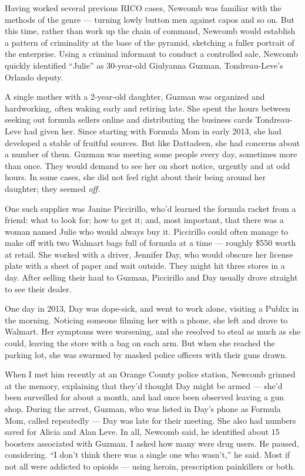 Having worked several previous RICO cases, Newcomb was familiar with the
methods of the genre --- turning lowly button men against capos and so
on. But this time, rather than work up the chain of command, Newcomb
would establish a pattern of criminality at the base of the pyramid,
sketching a fuller portrait of the enterprise. Using a criminal
informant to conduct a controlled sale, Newcomb quickly identified
``Julie'' as 30-year-old Giulyanna Guzman, Tondreau-Leve's Orlando
deputy.

A single mother with a 2-year-old daughter, Guzman was organized and
hardworking, often waking early and retiring late. She spent the hours
between seeking out formula sellers online and distributing the business
cards Tondreau-Leve had given her. Since starting with Formula Mom in
early 2013, she had developed a stable of fruitful sources. But like
Dattadeen, she had concerns about a number of them. Guzman was meeting
some people every day, sometimes more than once. They would demand to
see her on short notice, urgently and at odd hours. In some cases, she
did not feel right about their being around her daughter; they seemed
\emph{off.}

One such supplier was Janine Piccirillo, who'd learned the formula
racket from a friend: what to look for; how to get it; and, most
important, that there was a woman named Julie who would always buy it.
Piccirillo could often manage to make off with two Walmart bags full of
formula at a time --- roughly \$550 worth at retail. She worked with a
driver, Jennifer Day, who would obscure her license plate with a sheet
of paper and wait outside. They might hit three stores in a day. After
selling their haul to Guzman, Piccirillo and Day usually drove straight
to see their dealer.

One day in 2013, Day was dope-sick, and went to work alone, visiting a
Publix in the morning. Noticing someone filming her with a phone, she
left and drove to Walmart. Her symptoms were worsening, and she resolved
to steal as much as she could, leaving the store with a bag on each arm.
But when she reached the parking lot, she was swarmed by masked police
officers with their guns drawn.

When I met him recently at an Orange County police station, Newcomb
grinned at the memory, explaining that they'd thought Day might be armed
--- she'd been surveilled for about a month, and had once been observed
leaving a gun shop. During the arrest, Guzman, who was listed in Day's
phone as Formula Mom, called repeatedly --- Day was late for their
meeting. She also had numbers saved for Alicia and Alan Leve. In all,
Newcomb said, he identified about 15 boosters associated with Guzman. I
asked how many were drug users. He paused, considering. ``I don't think
there was a single one who wasn't,'' he said. Most if not all were
addicted to opioids --- using heroin, prescription painkillers or both.

